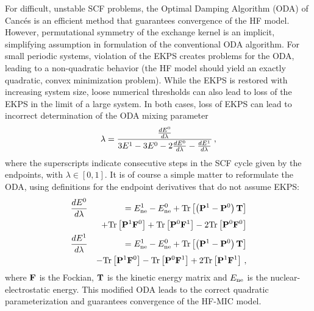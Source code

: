 \commentoutA{\documentclass[prb,aps,nobibnotes,twocolumn,doublespace,twocolumngrid,superbib,showpacs]{revtex4}}
\begin{document}
For difficult, unstable SCF problems, the Optimal Damping Algorithm (ODA) of Canc{\'e}s \cite{ECances00} is
an efficient method that guarantees convergence of the HF model.  
However,  permutational symmetry of the exchange kernel is an implicit, simplifying assumption in formulation
of the conventional ODA algorithm.   For small periodic systems, violation of the EKPS creates problems
for the ODA, leading to a non-quadratic behavior (the HF model should yield an exactly quadratic, convex 
minimization problem).   While the EKPS is restored with increasing system size, loose numerical thresholds
can also lead to loss of the EKPS in the limit of a large system.  
In both cases, loss of EKPS can lead to incorrect determination of the ODA mixing parameter
%
\begin{eqnarray}
\lambda = {{\frac{d E^0}{d \lambda}} \over {3E^1-3E^0-2{\frac{d E^0}{d \lambda}}-{\frac{d E^1}{d \lambda}}}} \, ,
\end{eqnarray}
%
where the superscripts indicate consecutive steps in the SCF cycle given by the endpoints, 
with $\lambda \in [0,1]$.   It is of course a simple matter to reformulate the ODA, using definitions 
for the endpoint derivatives that do not assume EKPS:
\begin{eqnarray}
\frac{d E^0}{d \lambda} &&=  E^{1}_{\rm ne}-E^{0}_{\rm ne}  
+{\rm Tr}\left[\left( {\bf P}^1 - {\bf P}^0 \right) {\bf T}  \right]\nonumber\\
&& +{\rm Tr}\left[ {\bf P}^1 {\bf F}^0 \right] 
   +{\rm Tr}\left[ {\bf P}^0 {\bf F}^1 \right] 
   -2 {\rm Tr}\left[ {\bf P}^0 {\bf F}^0 \right] \nonumber\\
\frac{d E^1}{d \lambda} &&=  E^{1}_{\rm ne}-E^{0}_{\rm ne}  
+{\rm Tr}\left[\left( {\bf P}^1 - {\bf P}^0 \right) {\bf T}  \right]\nonumber\\
&& -{\rm Tr}\left[ {\bf P}^1 {\bf F}^0 \right] 
   -{\rm Tr}\left[ {\bf P}^0 {\bf F}^1 \right] 
   +2 {\rm Tr}\left[ {\bf P}^1 {\bf F}^1 \right] \, , \nonumber\\
\end{eqnarray}
where  ${\bf F}$ is the Fockian, ${\bf T}$ is the kinetic energy matrix  and $E_{\rm ne}$ is the nuclear-electrostatic energy.
This  modified ODA leads to the correct quadratic parameterization and guarantees convergence of the HF-MIC model.  
\end{document}
